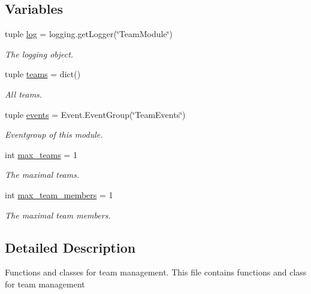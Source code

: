 \subsection*{\-Variables}
\begin{DoxyCompactItemize}
\item 
tuple \hyperlink{namespace_team_adf21711f1fc38203ea2e00d2118b33bc}{log} = logging.\-get\-Logger(\char`\"{}\-Team\-Module\char`\"{})
\begin{DoxyCompactList}\small\item\em \-The logging object. \end{DoxyCompactList}\item 
tuple \hyperlink{namespace_team_ac7c0217a52a864ca264b5f0e056e44bf}{teams} = dict()
\begin{DoxyCompactList}\small\item\em \-All teams. \end{DoxyCompactList}\item 
tuple \hyperlink{namespace_team_a6344bd783e89c08c58f61f8167d621b0}{events} = \-Event.\-Event\-Group(\char`\"{}\-Team\-Events\char`\"{})
\begin{DoxyCompactList}\small\item\em \-Eventgroup of this module. \end{DoxyCompactList}\item 
int \hyperlink{namespace_team_a96b76de309ef42248f9ef90cc57bb21b}{max\-\_\-teams} = 1
\begin{DoxyCompactList}\small\item\em \-The maximal teams. \end{DoxyCompactList}\item 
int \hyperlink{namespace_team_a94ac5cfcfc198fffc68d90217c447051}{max\-\_\-team\-\_\-members} = 1
\begin{DoxyCompactList}\small\item\em \-The maximal team members. \end{DoxyCompactList}\end{DoxyCompactItemize}


\subsection{\-Detailed \-Description}
\-Functions and classes for team management. \-This file contains functions and class for team management 


